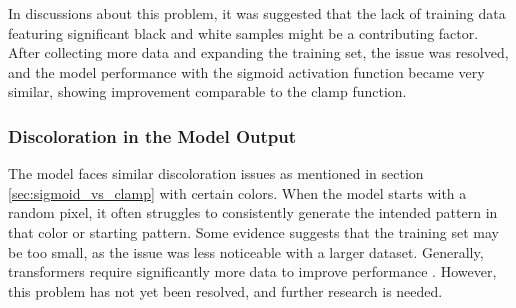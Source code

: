     In discussions about this problem, it was suggested that the lack of training data featuring significant black and white samples might be a contributing factor. After collecting more data and expanding the training set, the issue was resolved, and the model performance with the sigmoid activation function became very similar, showing improvement comparable to the clamp function.
    
    \subsubsection{Discoloration in the Model Output}
    
    The model faces similar discoloration issues as mentioned in section \autoref{sec:sigmoid_vs_clamp} with certain colors. When the model starts with a random pixel, it often struggles to consistently generate the intended pattern in that color or starting pattern. Some evidence suggests that the training set may be too small, as the issue was less noticeable with a larger dataset. Generally, transformers require significantly more data to improve performance \autocite{chen2022dearkd}. However, this problem has not yet been resolved, and further research is needed.




